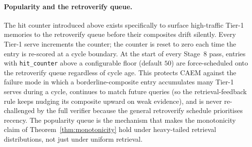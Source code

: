 \paragraph{Popularity and the retroverify queue.}
The hit counter introduced above exists specifically to surface high-traffic Tier-1 memories to the retroverify queue before their composites drift silently. Every Tier-1 serve increments the counter; the counter is reset to zero each time the entry is re-scored at a cycle boundary. At the start of every Stage~8 pass, entries with \texttt{hit\_counter} above a configurable floor (default $50$) are force-scheduled onto the retroverify queue regardless of cycle age. This protects CAEM against the failure mode in which a borderline-composite entry accumulates many Tier-1 serves during a cycle, continues to match future queries (so the retrieval-feedback rule keeps nudging its composite upward on weak evidence), and is never re-challenged by the full verifier because the general retroverify schedule prioritises recency. The popularity queue is the mechanism that makes the monotonicity claim of Theorem~\ref{thm:monotonicity} hold under heavy-tailed retrieval distributions, not just under uniform retrieval.

